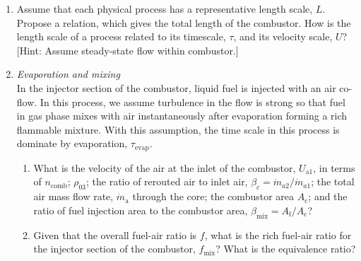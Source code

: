 \documentclass[11pt]{article}
\begin{document}
\begin{enumerate}[label=(\alph*)]
	\item
    	Assume that each physical process has a representative length scale, $L$. Propose a relation, which gives the total length of the combustor. How is the length scale of a process related to its timescale, $\tau$, and its velocity scale, $U$? [Hint: Assume steady-state flow within combustor.]
    \item \textit{Evaporation and mixing}\\
    	In the injector section of the combustor, liquid fuel is injected with an air co-flow. In this process, we assume turbulence in the flow is strong so that fuel in gas phase mixes with air instantaneously after evaporation forming a rich flammable mixture. With this assumption, the time scale in this process is dominate by evaporation, $\tau_\text{evap}$.
        \begin{enumerate}[label=(\roman*)]
        	\item
            	What is the velocity of the air at the inlet of the combustor, $U_{\mathrm{a}1}$, in terms of $n_\mathrm{comb}$; $\rho_\mathrm{03}$; the ratio of rerouted air to inlet air, $\beta_c=\dot{m}_{a2}/\dot{m}_{a1}$; the total air mass flow rate, $\dot m_\mathrm{a}$ through the core; the combustor area $A_\mathrm{c}$; and the ratio of fuel injection area to the combustor area, $\beta_\mathrm{mix}=A_\mathrm{f}/A_\mathrm{c}$?
            \item
            	Given that the overall fuel-air ratio is $f$, what is the rich fuel-air ratio for the injector section of the combustor, $f_\mathrm{mix}$? What is the equivalence ratio?
        	

\end{enumerate}
\end{enumerate}
\end{document}
